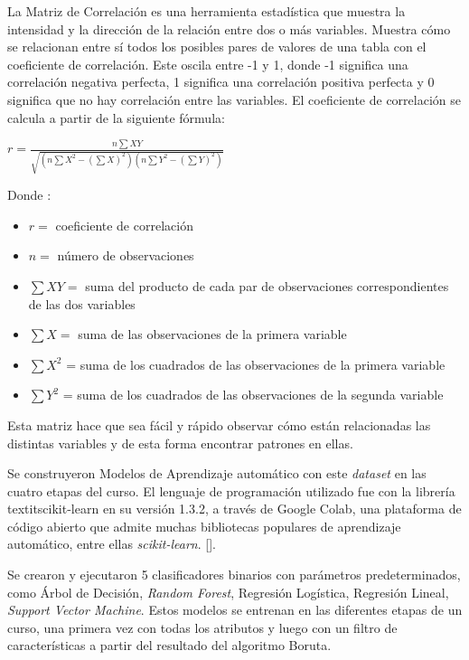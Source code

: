 La Matriz de Correlación es una herramienta estadística que muestra la intensidad y la dirección de la relación entre dos o más variables. Muestra cómo se relacionan entre sí todos los posibles 
pares de valores de una tabla con el coeficiente de correlación. Este oscila entre -1 y 1, donde -1 significa una correlación negativa perfecta, 
1 significa una correlación positiva perfecta y 0 significa que no hay correlación entre las variables. El coeficiente de correlación se calcula a partir de la siguiente fórmula: 

\begin{center}
    $r = \frac{n\sum{XY}}{\sqrt{(n\sum{X^2}-(\sum{X})^2)(n\sum{Y^2} - (\sum{Y})^2)}}$
\end{center}

Donde : 

\begin{itemize}
    \item $r =$ coeficiente de correlación
    \item $n =$ número de observaciones
    \item $\sum{XY} =$ suma del producto de cada par de observaciones correspondientes de las dos variables
    \item $\sum{X} =$ suma de las observaciones de la primera variable
    \item $\sum{X^2}$ = suma de los cuadrados de las observaciones de la primera variable
    \item $\sum{Y^2}$ = suma de los cuadrados de las observaciones de la segunda variable  
\end{itemize}

Esta matriz hace que sea fácil y rápido observar cómo están relacionadas las distintas variables y de esta forma encontrar patrones en ellas.  

Se construyeron Modelos de Aprendizaje automático con este \textit{dataset} en las cuatro etapas del curso. El lenguaje de programación utilizado fue con la librería textit{scikit-learn} en su versión 1.3.2, a través de Google Colab, una plataforma 
de código abierto que admite muchas bibliotecas populares de aprendizaje automático, entre ellas \textit{scikit-learn}. [\cite{wei-meng2019python}].  

Se crearon y ejecutaron 5 clasificadores binarios con parámetros predeterminados, como Árbol de Decisión, \textit{Random Forest}, 
Regresión Logística, Regresión Lineal, \textit{Support Vector Machine}. Estos modelos se entrenan en las diferentes etapas de un curso, una primera vez con todas los 
atributos y luego con un filtro de características a partir del resultado del algoritmo Boruta.


